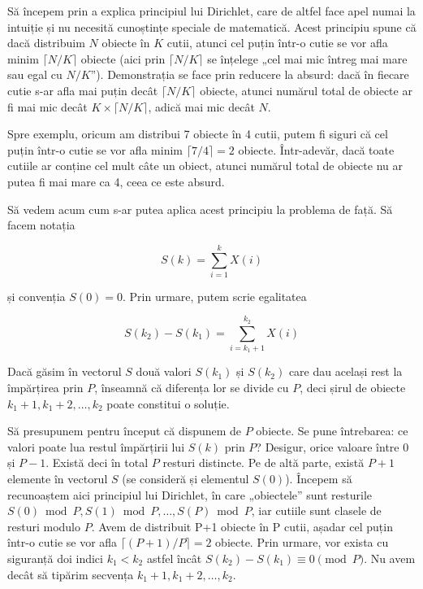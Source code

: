 Să începem prin a explica principiul lui Dirichlet, care de altfel face apel
numai la intuiție și nu necesită cunoștințe speciale de matematică. Acest
principiu spune că dacă distribuim $N$ obiecte în $K$ cutii, atunci cel puțin
într-o cutie se vor afla minim $\lceil N/K \rceil$ obiecte (aici prin $\lceil
N/K \rceil$ se înțelege „cel mai mic întreg mai mare sau egal cu
$N/K$”). Demonstrația se face prin reducere la absurd: dacă în fiecare cutie
s-ar afla mai puțin decât $\lceil N/K \rceil$ obiecte, atunci numărul total de
obiecte ar fi mai mic decât $K \times \lceil N/K \rceil$, adică mai mic decât
$N$.

Spre exemplu, oricum am distribui 7 obiecte în 4 cutii, putem fi siguri că cel
puțin într-o cutie se vor afla minim $\lceil 7/4 \rceil = 2$
obiecte. Într-adevăr, dacă toate cutiile ar conține cel mult câte un obiect,
atunci numărul total de obiecte nu ar putea fi mai mare ca 4, ceea ce este
absurd.

Să vedem acum cum s-ar putea aplica acest principiu la problema de față. Să
facem notația

\begin{equation}
  S(k) = \sum_{i = 1}^{k} X(i)
\end{equation}

și convenția $S(0) = 0$. Prin urmare, putem scrie egalitatea

\begin{equation}
  S(k_2) - S(k_1) = \sum_{i = k_1 + 1}^{k_2} X(i)
\end{equation}

Dacă găsim în vectorul $S$ două valori $S(k_1)$ și $S(k_2)$ care dau același
rest la împărțirea prin $P$, înseamnă că diferența lor se divide cu $P$, deci
șirul de obiecte $k_1+1, k_1+2, \dots, k_2$ poate constitui o soluție.

Să presupunem pentru început că dispunem de $P$ obiecte. Se pune întrebarea:
ce valori poate lua restul împărțirii lui $S(k)$ prin $P$? Desigur, orice
valoare între 0 și $P-1$. Există deci în total $P$ resturi distincte. Pe de
altă parte, există $P+1$ elemente în vectorul $S$ (se consideră și elementul
$S(0)$). Începem să recunoaștem aici principiul lui Dirichlet, în care
„obiectele” sunt resturile $S(0) \bmod P, S(1) \bmod P, \dots, S(P) \bmod P$,
iar cutiile sunt clasele de resturi modulo $P$. Avem de distribuit P+1 obiecte
în P cutii, așadar cel puțin într-o cutie se vor afla $\lceil (P+1)/P \rceil =
2$ obiecte. Prin urmare, vor exista cu siguranță doi indici $k_1 < k_2$ astfel
încât $S(k_2) - S(k_1) \equiv 0 \pmod{P}$. Nu avem decât să tipărim secvența
$k_1+1, k_1+2, \dots, k_2$.

